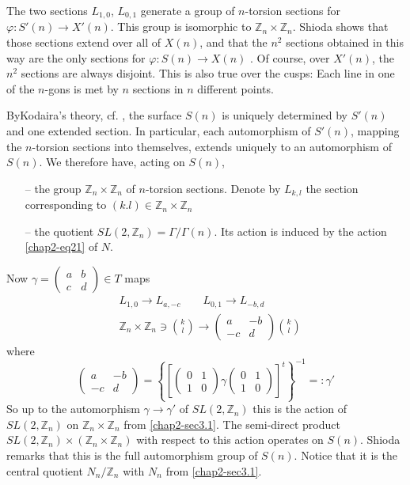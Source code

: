 The two sections $L_{1,0}$, $L_{0,1}$ generate a group of $n$-torsion
sections for $\varphi:S'(n)\to X'(n)$. This group is isomorphic to
$\mathbb{Z}_{n}\times \mathbb{Z}_{n}$. Shioda shows that those
sections extend over all of $X(n)$, and that the $n^{2}$ sections
obtained in this way are the only sections for $\varphi:S(n)\to
X(n)$ \cite[theorem 5.5]{chap2-key11}. Of course, over $X'(n)$, the
$n^{2}$ sections are always disjoint. This is also true over the
cusps: Each line in one of the $n$-gons is met by $n$ sections in $n$
different points.

By\pageoriginale Kodaira's theory, cf. \cite[V theorem
11.1(b)]{chap2-key2}, the surface $S(n)$ is uniquely determined by
$S'(n)$ and one extended section. In particular, each automorphism of
$S'(n)$, mapping the $n$-torsion sections into themselves, extends
uniquely to an automorphism of $S(n)$. We therefore have, acting on
$S(n)$,
\begin{itemize}
\item[--] the group $\mathbb{Z}_{n}\times \mathbb{Z}_{n}$ of
$n$-torsion sections. Denote by $L_{k,l}$ the section corresponding to
$(k.l)\in \mathbb{Z}_{n}\times\mathbb{Z}_{n}$

\item[--] the quotient $SL(2,\mathbb{Z}_{n})=\Gamma/\Gamma(n)$. Its
action is induced by the action \eqref{chap2-eq21} of $N$.
\end{itemize}

Now $\gamma=\left(\begin{smallmatrix} a & b\\ c &
d\end{smallmatrix}\right)\in T$ maps
\begin{align*}
& L_{1,0}\to L_{a,-c}\qquad L_{0,1}\to L_{-b,d}\\
& \mathbb{Z}_{n}\times \mathbb{Z}_{n}\ni \binom{k}{l}
\to\begin{pmatrix}
a & -b\\
-c & d
\end{pmatrix}
\binom{k}{l}
\end{align*}
where
$$
\begin{pmatrix}
a & -b\\
-c & d
\end{pmatrix}
=
\left\{\left[
\begin{pmatrix}
0 & 1\\
1 & 0
\end{pmatrix}
\gamma
\begin{pmatrix}
0 & 1\\
1 & 0
\end{pmatrix}
\right]^{t}\right\}^{-1}=:\gamma'
$$
So up to the automorphism $\gamma\to \gamma'$ of
$SL(2,\mathbb{Z}_{n})$ this is the action of $SL(2,\mathbb{Z}_{n})$ on
$\mathbb{Z}_{n}\times \mathbb{Z}_{n}$ from \ref{chap2-sec3.1}. The
semi-direct product\pageoriginale $SL(2,\mathbb{Z}_{n})\times
(\mathbb{Z}_{n}\times \mathbb{Z}_{n})$ with respect to this action
operates on $S(n)$. Shioda \cite{chap2-key11} remarks that this is the
full automorphism group of $S(n)$. Notice that it is the central
quotient $N_{n}/\mathbb{Z}_{n}$ with $N_{n}$ from \ref{chap2-sec3.1}.

